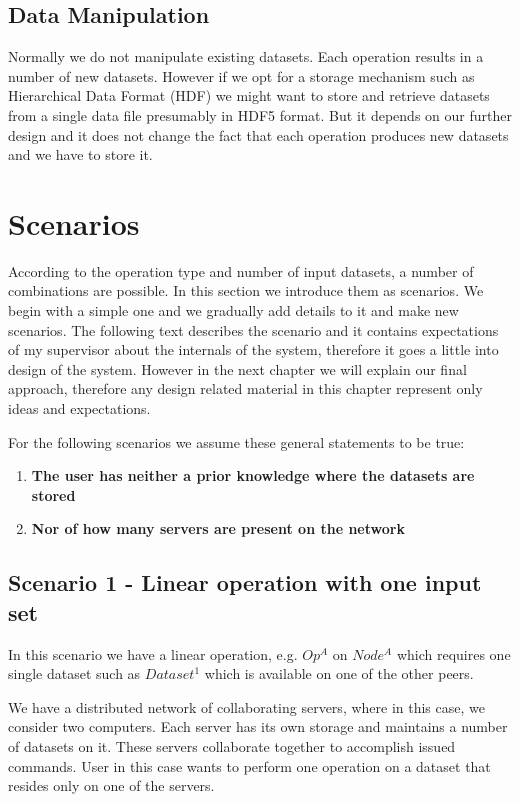 \subsection{Data Manipulation}
Normally we do not manipulate existing datasets. Each operation results in a number of new datasets. However if we
opt for a storage mechanism such as Hierarchical Data Format (HDF) we might want to store and retrieve datasets from
a single data file presumably in HDF5 format. But it depends on our further design and it does not change the fact
that each operation produces new datasets and we have to store it.


\section{Scenarios}
According to the operation type and number of input datasets, a number of combinations are possible.
In this section we introduce them as scenarios. We begin with a simple one and we gradually add details 
to it and make new scenarios. The following text describes the scenario and it contains expectations of 
my supervisor about the internals of the system, therefore it goes a little into design of the system. 
However in the next chapter we will explain our final approach, therefore any design related material in
this chapter represent only ideas and expectations.%

For the following scenarios we assume these general statements to be true:
\begin{enumerate}
\item \textbf{The user has neither a prior knowledge where the datasets are stored}
\item \textbf{Nor of how many servers are present on the network}
\end{enumerate}

\subsection{Scenario 1 - Linear operation with one input set}
\label{sc:sc1}
In this scenario we have a linear operation, e.g. \(Op^A\) on \(Node^A\) which
requires one single dataset such as \( Dataset^1 \) which is available on one of the other peers.

We have a distributed network of collaborating servers, where in this case, we consider two computers. 
Each server has its own storage and maintains a number of datasets on it. These servers collaborate 
together to accomplish issued commands. User in this case wants to perform one operation on a dataset
that resides only on one of the servers. 

